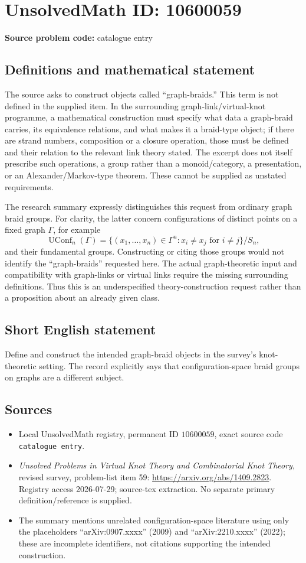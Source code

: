 \documentclass[11pt]{article}
\begin{document}
\section*{UnsolvedMath ID: 10600059}
\textbf{Source problem code:} catalogue entry
\subsection{Definitions and mathematical statement}
The source asks to construct objects called ``graph-braids.'' This term is not defined in the supplied item. In the surrounding graph-link/virtual-knot programme, a mathematical construction must specify what data a graph-braid carries, its equivalence relations, and what makes it a braid-type object; if there are strand numbers, composition or a closure operation, those must be defined and their relation to the relevant link theory stated. The excerpt does not itself prescribe such operations, a group rather than a monoid/category, a presentation, or an Alexander/Markov-type theorem. These cannot be supplied as unstated requirements.

The research summary expressly distinguishes this request from ordinary graph braid groups. For clarity, the latter concern configurations of distinct points on a fixed graph \(\Gamma\), for example
\[\operatorname{UConf}_n(\Gamma)=\{(x_1,\ldots,x_n)\in\Gamma^n:x_i\ne x_j\text{ for }i\ne j\}/S_n,\]
and their fundamental groups. Constructing or citing those groups would not identify the ``graph-braids'' requested here. The actual graph-theoretic input and compatibility with graph-links or virtual links require the missing surrounding definitions. Thus this is an underspecified theory-construction request rather than a proposition about an already given class.
\subsection{Short English statement}
Define and construct the intended graph-braid objects in the survey's knot-theoretic setting. The record explicitly says that configuration-space braid groups on graphs are a different subject.
\subsection{Sources}
\begin{itemize}
\item Local UnsolvedMath registry, permanent ID \(10600059\), exact source code \texttt{catalogue entry}.
\item \emph{Unsolved Problems in Virtual Knot Theory and Combinatorial Knot Theory}, revised survey, problem-list item 59: \url{https://arxiv.org/abs/1409.2823}. Registry access 2026-07-29; source-tex extraction. No separate primary definition/reference is supplied.
\item The summary mentions unrelated configuration-space literature using only the placeholders ``arXiv:0907.xxxx'' (2009) and ``arXiv:2210.xxxx'' (2022); these are incomplete identifiers, not citations supporting the intended construction.
\end{itemize}
\end{document}
